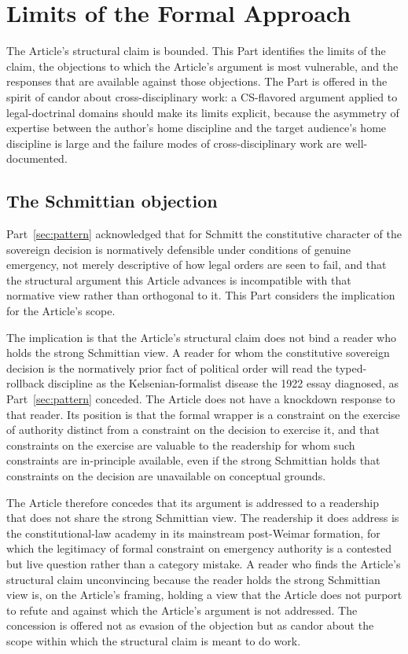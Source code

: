 \section{Limits of the Formal Approach}
\label{sec:limits}

The Article's structural claim is bounded.
This Part identifies the limits of the claim, the objections to which the Article's argument is most vulnerable,
and the responses that are available against those objections.
The Part is offered in the spirit of candor about cross-disciplinary work:
a CS-flavored argument applied to legal-doctrinal domains should make its limits explicit,
because the asymmetry of expertise between the author's home discipline and the target audience's home discipline
is large and the failure modes of cross-disciplinary work are well-documented.

\subsection{The Schmittian objection}

Part~\ref{sec:pattern} acknowledged that for Schmitt the constitutive character of the sovereign decision
is normatively defensible under conditions of genuine emergency, not merely descriptive of how legal orders
are seen to fail, and that the structural argument this Article advances is incompatible with that
normative view rather than orthogonal to it.
This Part considers the implication for the Article's scope.

The implication is that the Article's structural claim does not bind a reader who holds the strong Schmittian
view.
A reader for whom the constitutive sovereign decision is the normatively prior fact of political order
will read the typed-rollback discipline as the Kelsenian-formalist disease the 1922 essay diagnosed,
as Part~\ref{sec:pattern} conceded.
The Article does not have a knockdown response to that reader.
Its position is that the formal wrapper is a constraint on the exercise of authority distinct from a
constraint on the decision to exercise it,
and that constraints on the exercise are valuable to the readership for whom such constraints are
in-principle available,
even if the strong Schmittian holds that constraints on the decision are unavailable on conceptual grounds.

The Article therefore concedes that its argument is addressed to a readership that does not share the strong
Schmittian view.
The readership it does address is the constitutional-law academy in its mainstream post-Weimar formation,
for which the legitimacy of formal constraint on emergency authority is a contested but live question
rather than a category mistake.
A reader who finds the Article's structural claim unconvincing because the reader holds the strong
Schmittian view is, on the Article's framing, holding a view that the Article does not purport to refute
and against which the Article's argument is not addressed.
The concession is offered not as evasion of the objection but as candor about the scope within which the
structural claim is meant to do work.

